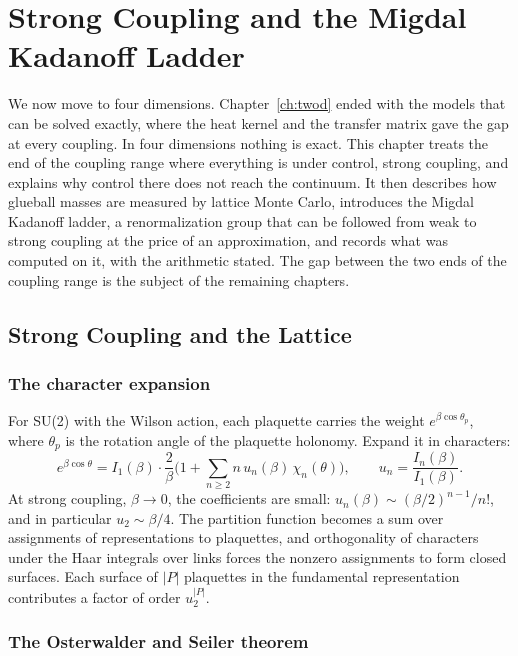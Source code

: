 \chapter{Strong Coupling and the Migdal Kadanoff Ladder}\label{ch:strong}

We now move to four dimensions. Chapter~\ref{ch:twod} ended with the models that can be solved exactly, where the heat kernel and the transfer matrix gave the gap at every coupling. In four dimensions nothing is exact. This chapter treats the end of the coupling range where everything is under control, strong coupling, and explains why control there does not reach the continuum. It then describes how glueball masses are measured by lattice Monte Carlo, introduces the Migdal Kadanoff ladder, a renormalization group that can be followed from weak to strong coupling at the price of an approximation, and records what was computed on it, with the arithmetic stated. The gap between the two ends of the coupling range is the subject of the remaining chapters.

\section{Strong Coupling and the Lattice}\label{sec:strongc}

\subsection{The character expansion}

For SU(2) with the Wilson action\cite{Wi74}, each plaquette carries the weight $e^{\beta\cos\theta_p}$, where $\theta_p$ is the rotation angle of the plaquette holonomy. Expand it in characters:
\[
e^{\beta\cos\theta}=I_1(\beta)\cdot\frac{2}{\beta}\Big(1+\sum_{n\ge2}n\,u_n(\beta)\,\chi_n(\theta)\Big),\qquad u_n=\frac{I_n(\beta)}{I_1(\beta)} .
\]
At strong coupling, $\beta\to0$, the coefficients are small: $u_n(\beta)\sim(\beta/2)^{n-1}/n!$, and in particular $u_2\sim\beta/4$. The partition function becomes a sum over assignments of representations to plaquettes, and orthogonality of characters under the Haar integrals over links forces the nonzero assignments to form closed surfaces. Each surface of $|P|$ plaquettes in the fundamental representation contributes a factor of order $u_2^{|P|}$.

\subsection{The Osterwalder and Seiler theorem}

